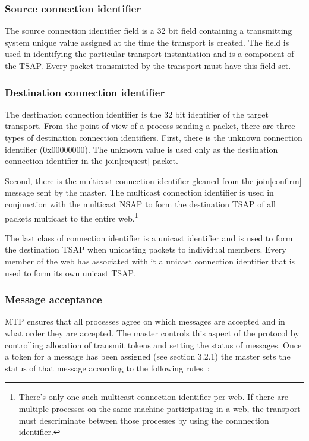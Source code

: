 \documentclass[11pt]{article}
\begin{document}
\hypertarget{source-connect}{\subsubsection{Source connection identifier}}

   The source connection identifier field is a 32 bit field containing a
   transmitting system unique value assigned at the time the transport
   is created. The field is used in identifying the particular transport
   instantiation and is a component of the TSAP\@. Every packet
   transmitted by the transport must have this field set.

\hypertarget{dest-connect}{\subsubsection{Destination connection identifier}}
\label{sec:dest-connect}

   The destination connection identifier is the 32 bit identifier of the
   target transport. From the point of view of a process sending a
   packet, there are three types of destination connection identifiers.
   First, there is the unknown connection identifier (0x00000000). The
   unknown value is used only as the destination connection identifier
   in the join[request] packet.

   Second, there is the multicast connection identifier gleaned from the
   join[confirm] message sent by the master. The multicast connection
   identifier is used in conjunction with the multicast NSAP to form the
   destination TSAP of all packets multicast to the entire
   web.\footnote{There's only one such multicast connection identifier per
   web. If there are multiple processes on the same machine participating
   in a web, the transport must descriminate between those processes by
   using the connnection identifier.}

   The last class of connection identifier is a unicast identifier and
   is used to form the destination TSAP when unicasting packets to
   individual members. Every member of the web has associated with it a
   unicast connection identifier that is used to form its own unicast
   TSAP.

\hypertarget{msg-accept}{\subsubsection{Message acceptance}}

   MTP ensures that all processes agree on which messages are accepted
   and in what order they are accepted. The master controls this aspect
   of the protocol by controlling allocation of transmit tokens and
   setting the status of messages. Once a token for a message has been
   assigned (see section 3.2.1) the master sets the status of that
   message according to the following rules~\cite{Armstrong91}:
\end{document}
